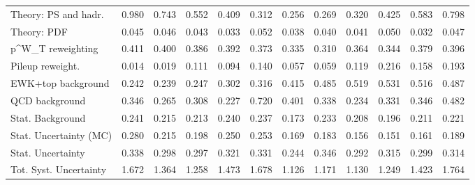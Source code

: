 \begin{tabular}{l|p{0.6cm}p{0.6cm}p{0.6cm}p{0.6cm}p{0.6cm}p{0.6cm}p{0.6cm}p{0.6cm}p{0.6cm}p{0.6cm}p{0.6cm}}
Theory: PS and hadr.                     & 0.980 & 0.743 & 0.552 & 0.409 & 0.312 & 0.256 & 0.269 & 0.320 & 0.425 & 0.583 & 0.798 \\
Theory: PDF                              & 0.045 & 0.046 & 0.043 & 0.033 & 0.052 & 0.038 & 0.040 & 0.041 & 0.050 & 0.032 & 0.047 \\
p^{W}_{T} reweighting                    & 0.411 & 0.400 & 0.386 & 0.392 & 0.373 & 0.335 & 0.310 & 0.364 & 0.344 & 0.379 & 0.396 \\
Pileup reweight.                         & 0.014 & 0.019 & 0.111 & 0.094 & 0.140 & 0.057 & 0.059 & 0.119 & 0.216 & 0.158 & 0.193 \\
EWK+top background                       & 0.242 & 0.239 & 0.247 & 0.302 & 0.316 & 0.415 & 0.485 & 0.519 & 0.531 & 0.516 & 0.487 \\
QCD background                           & 0.346 & 0.265 & 0.308 & 0.227 & 0.720 & 0.401 & 0.338 & 0.234 & 0.331 & 0.346 & 0.482 \\
Stat. Background                         & 0.241 & 0.215 & 0.213 & 0.240 & 0.237 & 0.173 & 0.233 & 0.208 & 0.196 & 0.211 & 0.221 \\
Stat. Uncertainty (MC)                   & 0.280 & 0.215 & 0.198 & 0.250 & 0.253 & 0.169 & 0.183 & 0.156 & 0.151 & 0.161 & 0.189 \\
\hline
Stat. Uncertainty                        & 0.338 & 0.298 & 0.297 & 0.321 & 0.331 & 0.244 & 0.346 & 0.292 & 0.315 & 0.299 & 0.314 \\
\hline
Tot. Syst. Uncertainty                   & 1.672 & 1.364 & 1.258 & 1.473 & 1.678 & 1.126 & 1.171 & 1.130 & 1.249 & 1.423 & 1.764 \\
\hline
\end{tabular}
